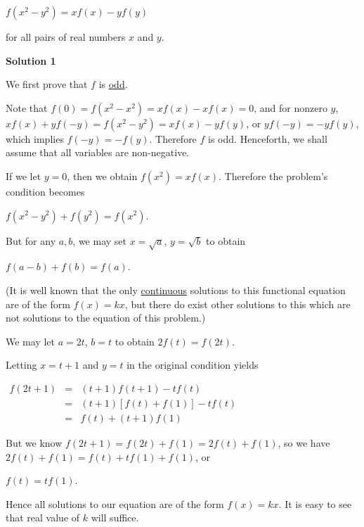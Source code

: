 \begin{enumerate}
 
$f(x^2 - y^2) = xf(x) - yf(y)$


 


 for all pairs of real numbers $x$ and $y$.


 



\textbf{Solution 1}

We first prove that $f$ is \href{https://artofproblemsolving.com/wiki/index.php?title=Odd\_function}{ odd}.

 Note that $f(0) = f(x^2 - x^2) = xf(x) - xf(x) = 0$, and for nonzero $y$, $xf(x) + yf(-y) = f(x^2 - y^2) = xf(x) - yf(y)$, or $yf(-y) = -yf(y)$, which implies $f(-y) = -f(y)$.  Therefore $f$ is odd.  Henceforth, we shall assume that all variables are non-negative.

 If we let $y = 0$, then we obtain $f(x^2) = xf(x)$.  Therefore the problem's condition becomes

 $f(x^2 - y^2) + f(y^2) = f(x^2)$.

 

 But for any $a,b$, we may set $x = \sqrt{a}$, $y = \sqrt{b}$ to obtain

 $f(a-b) + f(b) = f(a)$.

 

 (It is well known that the only \href{https://artofproblemsolving.com/wiki/index.php?title=Continuous}{continuous} solutions to this functional equation are of the form $f(x) = kx$, but there do exist other solutions to this which are not solutions to the equation of this problem.)

 We may let $a = 2t$, $b = t$ to obtain $2f(t) = f(2t)$.

 Letting $x = t+1$ and $y = t$ in the original condition yields

 $\begin{matrix}f(2t+1) &=& (t+1)f(t+1) - tf(t) \qquad \\ &=& (t+1)[f(t) + f(1) ] - tf(t) \\ &=& f(t) + (t+1)f(1) \qquad \qquad \end{matrix}$

 

 But we know $f(2t + 1) = f(2t) + f(1) = 2f(t) + f(1)$, so we have $2f(t) + f(1) = f(t) + tf(1) + f(1)$, or

 $f(t) = tf(1)$.

 

 Hence all solutions to our equation are of the form $f(x) = kx$.  It is easy to see that real value of $k$ will suffice.


\end{enumerate}
